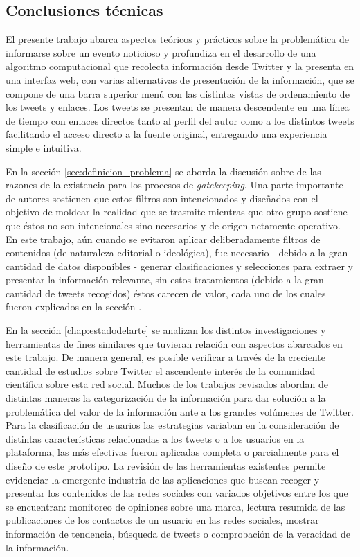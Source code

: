 \subsection{Conclusiones técnicas}

El presente trabajo abarca aspectos teóricos y prácticos sobre la problemática
de informarse sobre un evento noticioso y profundiza en el desarrollo de una algoritmo computacional que recolecta información desde Twitter y la presenta en una interfaz web, con varias alternativas de presentación de la información, que se compone de una barra superior menú con las distintas vistas de ordenamiento de los tweets y enlaces. Los tweets se presentan de manera descendente en una línea de tiempo con enlaces directos tanto al perfil del autor como a los distintos tweets facilitando el acceso directo a la fuente original, entregando una experiencia simple e intuitiva.

En la sección \ref{sec:definicion_problema} se aborda la discusión sobre de las razones de la existencia para los procesos de \emph{gatekeeping}. Una parte importante de autores sostienen que estos filtros son intencionados y diseñados con el objetivo de moldear la realidad que se trasmite mientras que otro grupo sostiene que éstos no son intencionales sino necesarios y de origen netamente operativo. En este trabajo, aún cuando se evitaron aplicar deliberadamente filtros de contenidos (de naturaleza editorial o ideológica), fue necesario - debido a la gran cantidad de datos disponibles - generar clasificaciones y selecciones para extraer y presentar la información relevante, sin estos tratamientos (debido a la gran cantidad de tweets recogidos) éstos carecen de valor, cada uno de los cuales fueron explicados en la sección \label{chap:propuesta_cap}.

En la sección \ref{chap:estadodelarte} se analizan los distintos investigaciones y herramientas de fines similares que tuvieran relación con aspectos abarcados en este trabajo. De manera general, es posible verificar a través de la creciente  cantidad de estudios sobre Twitter el ascendente interés de la comunidad científica sobre esta red social. Muchos de los trabajos revisados abordan de distintas maneras la categorización de la información para dar solución a la problemática del valor de la información ante a los grandes volúmenes de Twitter. Para la clasificación de usuarios las estrategias variaban en la consideración de distintas características relacionadas a los tweets o a los usuarios en la plataforma, las más efectivas fueron aplicadas completa o parcialmente para el diseño de este prototipo. La revisión de las herramientas existentes permite evidenciar la emergente industria de las aplicaciones que buscan recoger y presentar los contenidos de las redes sociales con variados objetivos entre los que se encuentran: monitoreo de opiniones sobre una marca, lectura resumida de las publicaciones de los contactos de un usuario en las redes sociales, mostrar información de tendencia, búsqueda de tweets o comprobación de la veracidad de la información.

